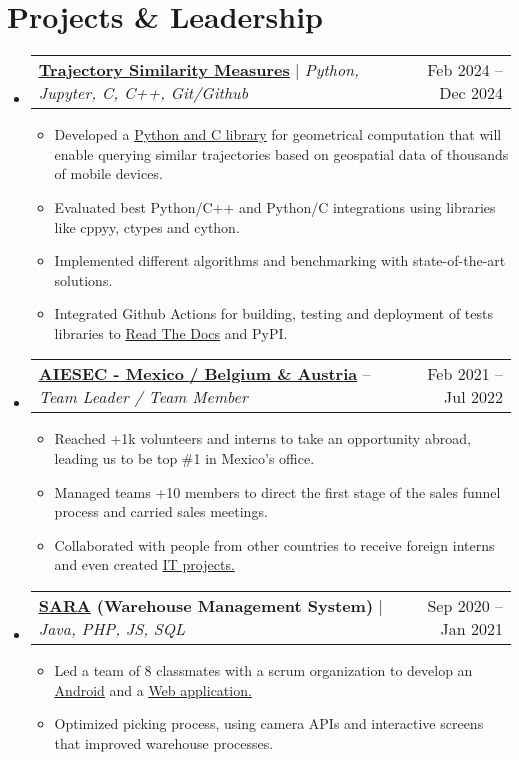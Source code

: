 \documentclass[letterpaper,11pt]{article}
\makeatletter
\newcommand{\resumeItem}[1]{
  \item\small{
    {#1 \vspace{-2pt}}
  }
}
\newcommand{\resumeProjectHeading}[2]{
    \item
    \begin{tabular*}{0.97\textwidth}{l@{\extracolsep{\fill}}r}
      \small#1 & #2 \\
    \end{tabular*}\vspace{-7pt}
}
\newcommand{\resumeSubHeadingListStart}{\begin{itemize}[leftmargin=0.15in, label={}]}
\newcommand{\resumeSubHeadingListEnd}{\end{itemize}}
\newcommand{\resumeItemListStart}{\begin{itemize}}
\newcommand{\resumeItemListEnd}{\end{itemize}\vspace{-5pt}}
\makeatother
\begin{document}
\section{Projects \& Leadership}
    \resumeSubHeadingListStart
      \resumeProjectHeading
          {\href{https://pypi.org/project/stmeasures/}
          {\textbf{\underline{Trajectory Similarity Measures}}} $|$
          \emph{Python, Jupyter, C, C++, Git/Github}}
          {Feb 2024 -- Dec 2024}
          \resumeItemListStart
            \resumeItem{Developed a \href{https://github.com/TT2024-B106/stmeasures}
            {\underline{Python and C library}} for geometrical computation that will enable
            querying similar trajectories based on geospatial data of thousands of mobile devices.}
            \resumeItem{Evaluated best Python/C++ and Python/C integrations using libraries like
            cppyy, ctypes and cython.}
            \resumeItem{Implemented different algorithms and benchmarking with state-of-the-art
            solutions.}
            \resumeItem{Integrated Github Actions for building, testing and deployment of tests
            libraries to \href{https://stmeasures.readthedocs.io/en/latest/}{\underline{Read The
            Docs}} and PyPI.}
          \resumeItemListEnd
      \resumeProjectHeading
          {\href{https://drive.google.com/file/d/1EMWTYJzj80dJdlMeuz7X3F-bEpyTPFCr/view}
          {\textbf{\underline{AIESEC - Mexico}}
          \textbf{/ Belgium \& Austria}} --
          \emph{Team Leader / Team Member}}{Feb 2021 -- Jul 2022}
          \resumeItemListStart
            \resumeItem{Reached +1k volunteers and interns to take an opportunity abroad, leading
            us to be top \#1 in Mexico’s office.}
            \resumeItem{Managed teams +10 members to direct the first stage of the sales
            funnel process and carried sales meetings.}
            \resumeItem{Collaborated with people from other countries to receive foreign interns
            and even created \href{https://github.com/edoomm/time-tracker}{\underline{IT
            projects}.}}
          \resumeItemListEnd
      \resumeProjectHeading
          {\textbf{\href{https://drive.google.com/file/d/1b1CNu-eeZlTg1rc_nXvGEXps3hik2itj/view}
          {\underline{SARA}}
          (Warehouse Management System)} $|$
          \emph{Java, PHP, JS, SQL}}
          {Sep 2020 -- Jan 2021}
          \resumeItemListStart
            \resumeItem{Led a team of 8 classmates with a scrum organization to develop an
            \href{https://github.com/edoomm/sistema-picking-app}{\underline{Android}} and a 
            \href{https://github.com/edoomm/sistema-picking-web}{\underline{Web application}.}}
            \resumeItem{Optimized picking process, using camera APIs and interactive screens that
            improved warehouse processes.}
          \resumeItemListEnd
    \resumeSubHeadingListEnd
\end{document}
